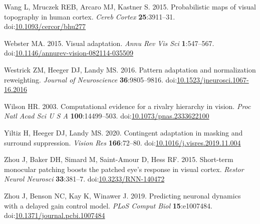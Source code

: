\documentclass[
]{article}
\newlength{\cslhangindent}
\newlength{\cslentryspacingunit} %
\newenvironment{CSLReferences}[2] %
 {%
  \setlength{\parindent}{0pt}
  \ifodd #1
  \let\oldpar\par
  \def\par{\hangindent=\cslhangindent\oldpar}
  \fi
  \setlength{\parskip}{#2\cslentryspacingunit}
 }%
 {}
\begin{document}
\begin{CSLReferences}{1}{0}
\leavevmode{}%
Wang L, Mruczek REB, Arcaro MJ, Kastner S. 2015. Probabilistic maps of visual topography in human cortex. \emph{Cereb Cortex} \textbf{25}:3911--31. doi:\href{https://doi.org/10.1093/cercor/bhu277}{10.1093/cercor/bhu277}

\leavevmode{}%
Webster MA. 2015. Visual adaptation. \emph{Annu Rev Vis Sci} \textbf{1}:547--567. doi:\href{https://doi.org/10.1146/annurev-vision-082114-035509}{10.1146/annurev-vision-082114-035509}

\leavevmode{}%
Westrick ZM, Heeger DJ, Landy MS. 2016. Pattern adaptation and normalization reweighting. \emph{Journal of Neuroscience} \textbf{36}:9805--9816. doi:\href{https://doi.org/10.1523/jneurosci.1067-16.2016}{10.1523/jneurosci.1067-16.2016}

\leavevmode{}%
Wilson HR. 2003. Computational evidence for a rivalry hierarchy in vision. \emph{Proc Natl Acad Sci U S A} \textbf{100}:14499--503. doi:\href{https://doi.org/10.1073/pnas.2333622100}{10.1073/pnas.2333622100}

\leavevmode{}%
Yiltiz H, Heeger DJ, Landy MS. 2020. Contingent adaptation in masking and surround suppression. \emph{Vision Res} \textbf{166}:72--80. doi:\href{https://doi.org/10.1016/j.visres.2019.11.004}{10.1016/j.visres.2019.11.004}

\leavevmode{}%
Zhou J, Baker DH, Simard M, Saint-Amour D, Hess RF. 2015. Short-term monocular patching boosts the patched eye's response in visual cortex. \emph{Restor Neurol Neurosci} \textbf{33}:381--7. doi:\href{https://doi.org/10.3233/RNN-140472}{10.3233/RNN-140472}

\leavevmode{}%
Zhou J, Benson NC, Kay K, Winawer J. 2019. Predicting neuronal dynamics with a delayed gain control model. \emph{PLoS Comput Biol} \textbf{15}:e1007484. doi:\href{https://doi.org/10.1371/journal.pcbi.1007484}{10.1371/journal.pcbi.1007484}

\end{CSLReferences}
\end{document}
